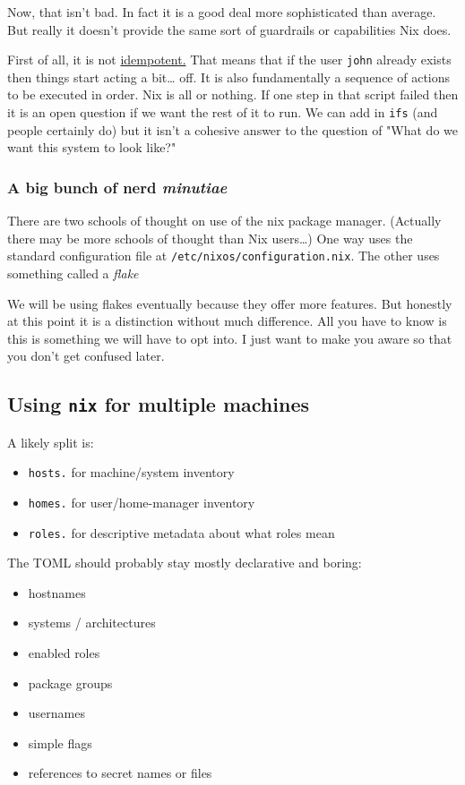 \documentclass[11pt]{article}
\begin{document}
Now, that isn't bad. In fact it is a good deal more sophisticated than average. But really it doesn't provide the same sort of guardrails or capabilities Nix does.

First of all, it is not \href{https://en.wikipedia.org/wiki/Idempotence}{idempotent.} That means that if the user \texttt{john} already exists then things start acting a bit\ldots{} off. It is also fundamentally a sequence of actions to be executed in order. Nix is all or nothing. If one step in that script failed then it is an open question if we want the rest of it to run. We can add in \texttt{ifs} (and people certainly do) but it isn't a cohesive answer to the question of "What do we want this system to look like?"
\subsubsection{A big bunch of nerd \emph{minutiae}}
\label{sec:org94dec95}
There are two schools of thought on use of the nix package manager. (Actually there may be more schools of thought than Nix users\ldots{}) One way uses the standard configuration file at \texttt{/etc/nixos/configuration.nix}. The other uses something called a \emph{flake}

We will be using flakes eventually because they offer more features. But honestly at this point it is a distinction without much difference. All you have to know is this is something we will have to opt into. I just want to make you aware so that you don't get confused later. 
\subsection{Using \texttt{nix} for multiple machines}
\label{sec:org12eca6c}
A likely split is:
\begin{itemize}
\item \texttt{hosts.} for machine/system inventory
\item \texttt{homes.} for user/home-manager inventory
\item \texttt{roles.} for descriptive metadata about what roles mean
\end{itemize}

The TOML should probably stay mostly declarative and boring:
\begin{itemize}
\item hostnames
\item systems / architectures
\item enabled roles
\item package groups
\item usernames
\item simple flags
\item references to secret names or files
\end{itemize}
\end{document}
